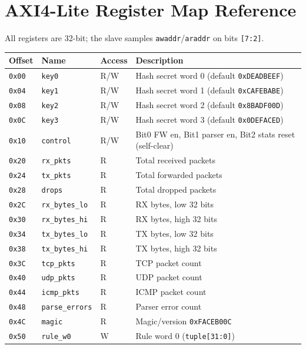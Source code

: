 \documentclass[12pt,twoside,openright]{book}
\begin{document}
\chapter{AXI4-Lite Register Map Reference}
\label{app:regmap}

All registers are 32-bit; the slave samples \texttt{awaddr}/\texttt{araddr} on bits \texttt{[7:2]}.

\begin{longtable}{llll}
\toprule
\textbf{Offset} & \textbf{Name} & \textbf{Access} & \textbf{Description} \\
\midrule
\texttt{0x00} & \texttt{key0} & R/W & Hash secret word 0 (default \texttt{0xDEADBEEF}) \\
\texttt{0x04} & \texttt{key1} & R/W & Hash secret word 1 (default \texttt{0xCAFEBABE}) \\
\texttt{0x08} & \texttt{key2} & R/W & Hash secret word 2 (default \texttt{0x8BADF00D}) \\
\texttt{0x0C} & \texttt{key3} & R/W & Hash secret word 3 (default \texttt{0x0DEFACED}) \\
\texttt{0x10} & \texttt{control} & R/W & Bit0 FW en, Bit1 parser en, Bit2 stats reset (self-clear) \\
\texttt{0x20} & \texttt{rx\_pkts} & R & Total received packets \\
\texttt{0x24} & \texttt{tx\_pkts} & R & Total forwarded packets \\
\texttt{0x28} & \texttt{drops} & R & Total dropped packets \\
\texttt{0x2C} & \texttt{rx\_bytes\_lo} & R & RX bytes, low 32 bits \\
\texttt{0x30} & \texttt{rx\_bytes\_hi} & R & RX bytes, high 32 bits \\
\texttt{0x34} & \texttt{tx\_bytes\_lo} & R & TX bytes, low 32 bits \\
\texttt{0x38} & \texttt{tx\_bytes\_hi} & R & TX bytes, high 32 bits \\
\texttt{0x3C} & \texttt{tcp\_pkts} & R & TCP packet count \\
\texttt{0x40} & \texttt{udp\_pkts} & R & UDP packet count \\
\texttt{0x44} & \texttt{icmp\_pkts} & R & ICMP packet count \\
\texttt{0x48} & \texttt{parse\_errors} & R & Parser error count \\
\texttt{0x4C} & \texttt{magic} & R & Magic/version \texttt{0xFACEB00C} \\
\texttt{0x50} & \texttt{rule\_w0} & W & Rule word 0 (\texttt{tuple[31:0]}) \\

\end{longtable}
\end{document}
